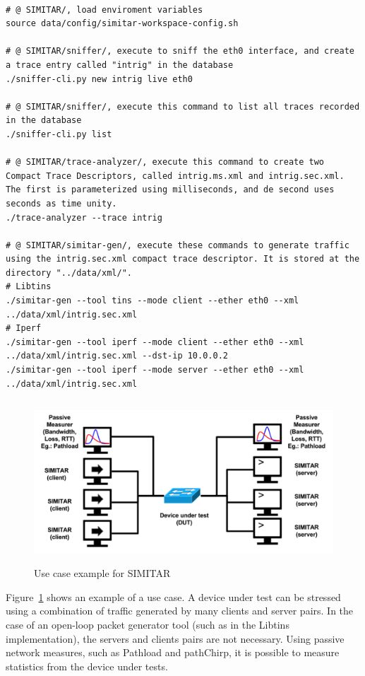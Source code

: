 \begin{verbatim}

# @ SIMITAR/, load enviroment variables
source data/config/simitar-workspace-config.sh

# @ SIMITAR/sniffer/, execute to sniff the eth0 interface, and create a trace entry called "intrig" in the database
./sniffer-cli.py new intrig live eth0

# @ SIMITAR/sniffer/, execute this command to list all traces recorded in the database
./sniffer-cli.py list

# @ SIMITAR/trace-analyzer/, execute this command to create two Compact Trace Descriptors, called intrig.ms.xml and intrig.sec.xml. The first is parameterized using milliseconds, and de second uses seconds as time unity.
./trace-analyzer --trace intrig

# @ SIMITAR/simitar-gen/, execute these commands to generate traffic using the intrig.sec.xml compact trace descriptor. It is stored at the directory "../data/xml/". 
# Libtins
./simitar-gen --tool tins --mode client --ether eth0 --xml ../data/xml/intrig.sec.xml 
# Iperf
./simitar-gen --tool iperf --mode client --ether eth0 --xml ../data/xml/intrig.sec.xml --dst-ip 10.0.0.2
./simitar-gen --tool iperf --mode server --ether eth0 --xml ../data/xml/intrig.sec.xml

\end{verbatim}


\begin{figure}[ht!]
    \centering
    \includegraphics[height=2.4in]{figures/ch3/use-case}
    \caption{Use case example for SIMITAR}
    \label{fig:use-case}
\end{figure}



Figure~\ref{fig:use-case} shows an example of a use case. A device under test can be stressed using a combination of traffic generated by many clients and server pairs. In the case of an open-loop packet generator tool (such as in the Libtins implementation), the servers and clients pairs are not necessary. Using passive network measures, such as Pathload\cite{web-pathload} and pathChirp\cite{swing-paper}\cite{web-pathchirp}, it is possible to measure statistics from the device under tests.
